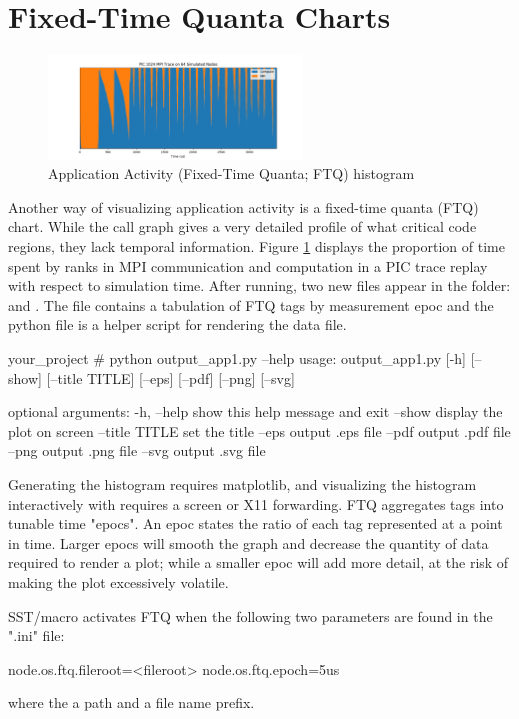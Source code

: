 

\section{Fixed-Time Quanta Charts}

\label{sec:tutorials:ftq}

\begin{figure}[h!]
\centering
\includegraphics[width=0.6\textwidth]{figures/matplotlib/ftq/pic1024.png}
\caption{Application Activity (Fixed-Time Quanta; FTQ) histogram}
\label{fig:ftq}
\end{figure}

Another way of visualizing application activity is a fixed-time quanta (FTQ) chart.
While the call graph gives a very detailed profile of what critical code regions, they lack temporal information. 
Figure \ref{fig:ftq} displays the proportion of time spent by ranks in MPI communication and computation in a PIC trace replay with respect to simulation time.
After running, two new files appear in the folder:  and .
The  file contains a tabulation of FTQ tags by measurement epoc and the python file is a helper script for rendering the data file.

\begin{ShellCmd}
your_project # python output_app1.py --help
usage: output_app1.py [-h] [--show] [--title TITLE] [--eps] [--pdf] [--png]
                      [--svg]

optional arguments:
  -h, --help     show this help message and exit
  --show         display the plot on screen
  --title TITLE  set the title
  --eps          output .eps file
  --pdf          output .pdf file
  --png          output .png file
  --svg          output .svg file
\end{ShellCmd}

Generating the histogram requires matplotlib, and visualizing the histogram interactively with  requires a screen or X11 forwarding.
FTQ aggregates tags into tunable time "epocs".
An epoc states the ratio of each tag represented at a point in time.
Larger epocs will smooth the graph and decrease the quantity of data required to render a plot; while a smaller epoc will add more detail, at the risk of making the plot excessively volatile.


SST/macro activates FTQ when the following two parameters are found in the ".ini" file:

\begin{ViFile}
node.os.ftq.fileroot=<fileroot>
node.os.ftq.epoch=5us
\end{ViFile}
where the  a path and a file name prefix.
